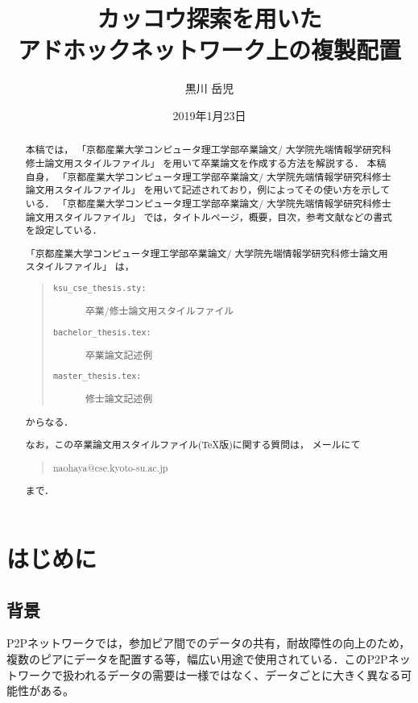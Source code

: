 \documentclass[11pt]{jreport}
\title{カッコウ探索を用いた\\
       アドホックネットワーク上の複製配置}
\author{黒川 岳児}
\date{2019年1月23日}	%
\begin{document}
\maketitle

\begin{abstract}
本稿では，
「京都産業大学コンピュータ理工学部卒業論文/
  大学院先端情報学研究科修士論文用スタイルファイル」
を用いて卒業論文を作成する方法を解説する．
本稿自身，
「京都産業大学コンピュータ理工学部卒業論文/
  大学院先端情報学研究科修士論文用スタイルファイル」
を用いて記述されており，例によってその使い方を示している．
「京都産業大学コンピュータ理工学部卒業論文/
  大学院先端情報学研究科修士論文用スタイルファイル」
では，タイトルページ，概要，目次，参考文献などの書式を設定している．

  「京都産業大学コンピュータ理工学部卒業論文/
  大学院先端情報学研究科修士論文用スタイルファイル」
は，
\begin{quote}
  \begin{description}
    \item[\tt ksu\_cse\_thesis.sty:] 卒業/修士論文用スタイルファイル
    \item[\tt bachelor\_thesis.tex:] 卒業論文記述例
    \item[\tt master\_thesis.tex:] 修士論文記述例    
  \end{description}
\end{quote}
からなる．

なお，この卒業論文用スタイルファイル(\TeX 版)に関する質問は，
メールにて
\begin{quote}
naohaya@cse.kyoto-su.ac.jp
\end{quote}
まで．

\end{abstract}

\tableofcontents



\newpage
{}	%



\chapter{はじめに}
\section{背景}
P2Pネットワークでは，参加ピア間でのデータの共有，耐故障性の向上のため，複数のピアにデータを配置する等，幅広い用途で使用されている．このP2Pネットワークで扱われるデータの需要は一様ではなく、データごとに大きく異なる可能性がある。
\end{document}
